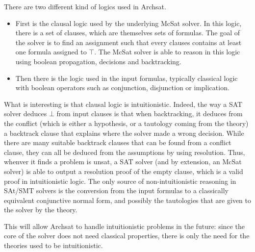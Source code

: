 There are two different kind of logics used in Archsat.
\begin{itemize}
  \item First is the clausal
    logic used by the underlying McSat solver. In this logic, there is a set of
    clauses, which are themselves sets of formulas. The goal of the solver is
    to find an assignment such that every clauses contains at least one formula
    assigned to $\top$. The McSat solver is able to reason in this logic
    using boolean propagation, decisions and backtracking.
  \item Then there is the logic used in the input formulas, typically classical logic
    with boolean operators such as conjunction, disjunction or implication.
\end{itemize}

What is interesting is that clausal logic is intuitionistic. Indeed, the way a
SAT solver deduces $\bot$ from input clauses is that when backtracking, it deduces
from the conflict (which is either a hypothesis, or a tautology coming from the theory)
a backtrack clause that explains where the solver made a wrong decision.
While there are many suitable backtrack clauses that can be found from a conflict clause,
they can all be deduced from the assumptions by using resolution. Thus, whenver it finds
a problem is unsat, a SAT solver (and by extension, an McSat solver) is able to output a
resolution proof of the empty clause, which is a valid proof in intuitionistic logic.
The only source of non-intuitionistic reasoning in SAt/SMT solvers is the conversion
from the input formulas to a classically equivalent conjunctive normal form, and
possibly the tautologies that are given to the solver by the theory.

This will allow Archsat to handle intuitionistic problems in the future: since
the core of the solver does not need classical properties, there is only the need
for the theories used to be intuitionistic.

